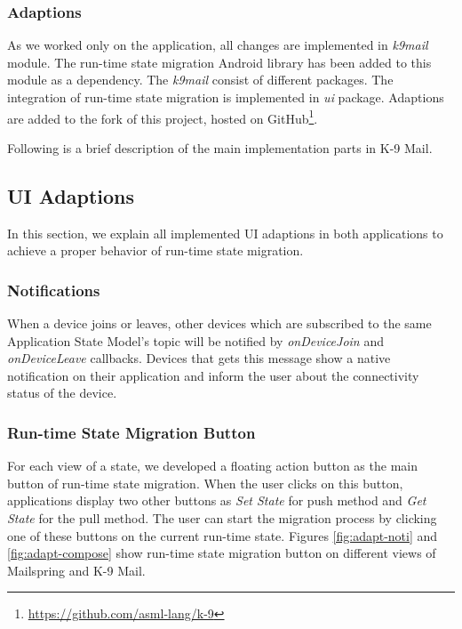 \subsubsection{Adaptions}
As we worked only on the application, all changes are implemented in \textit{k9mail} module. The run-time state migration Android library has been added to this module as a dependency. The \textit{k9mail} consist of different packages. The integration of run-time state migration is implemented in \textit{ui} package. Adaptions are added to the fork of this project, hosted on GitHub\footnote{\url{https://github.com/asml-lang/k-9}}. 

Following is a brief description of the main implementation parts in K-9 Mail.


\subsection{UI Adaptions}
In this section, we explain all implemented UI adaptions in both applications to achieve a proper behavior of run-time state migration. 

\subsubsection{Notifications}
When a device joins or leaves, other devices which are subscribed to the same Application State Model's topic will be notified by \textit{onDeviceJoin} and \textit{onDeviceLeave} callbacks. Devices that gets this message show a native notification on their application and inform the user about the connectivity status of the device.

\subsubsection{Run-time State Migration Button}
For each view of a state, we developed a floating action button as the main button of run-time state migration. When the user clicks on this button, applications display two other buttons as \textit{Set State} for push method and \textit{Get State} for the pull method. The user can start the migration process by clicking one of these buttons on the current run-time state. Figures \ref{fig:adapt-noti} and \ref{fig:adapt-compose} show run-time state migration button on different views of Mailspring and K-9 Mail. 

